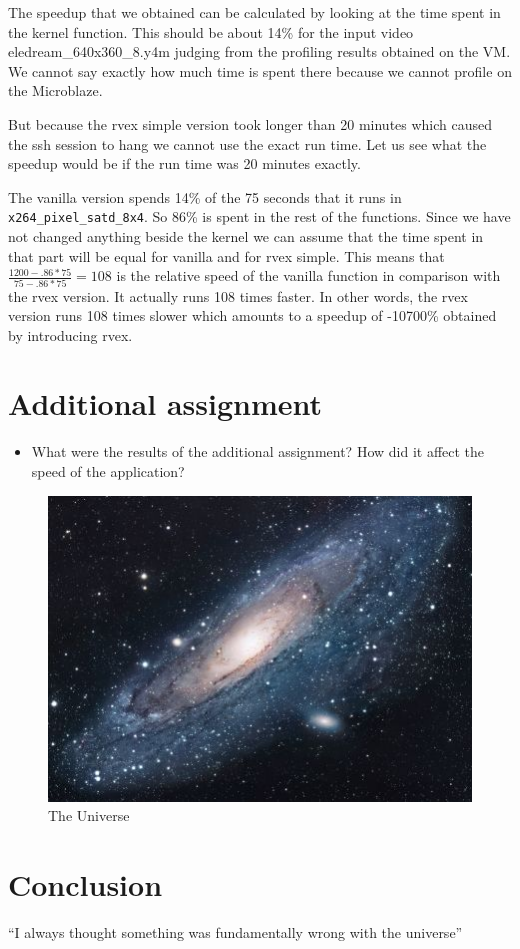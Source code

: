 \documentclass{article}
\newcommand{\satd}{\texttt{x264\_pixel\_satd\_8x4}}
\begin{document}
The speedup that we obtained can be calculated by looking at the time spent in the kernel function. 
This should be about 14\% for the input video eledream\_640x360\_8.y4m judging from the profiling results obtained on the VM. 
We cannot say exactly how much time is spent there because we cannot profile on the Microblaze. 

But because the rvex simple version took longer than 20 minutes which caused the ssh session to hang we cannot use the exact run time. 
Let us see what the speedup would be if the run time was 20 minutes exactly. 

The vanilla version spends 14\% of the 75 seconds that it runs in \satd{}. So 86\% is spent in the rest of the functions. 
Since we have not changed anything beside the kernel we can assume that the time spent in that part will be equal for vanilla and for rvex simple. 
This means that $\frac{1200 - .86*75}{75 - .86*75} = 108$ is the relative speed of the vanilla function in comparison with the rvex version. 
It actually runs 108 times faster. 
In other words, the rvex version runs 108 times slower which amounts to a speedup of -10700\% obtained by introducing rvex. 

\section{Additional assignment}

\begin{itemize}
  \item What were the results of the additional assignment? How did it affect
        the speed of the application?
\end{itemize}

\begin{figure}[h!]
  \centering
  \includegraphics[scale=1.7]{universe.jpg}
  \caption{The Universe}
  \label{threadsVsSync}
\end{figure}

\section{Conclusion}

``I always thought something was fundamentally wrong with the universe'' \citep{adams1995hitchhiker}



\end{document}
